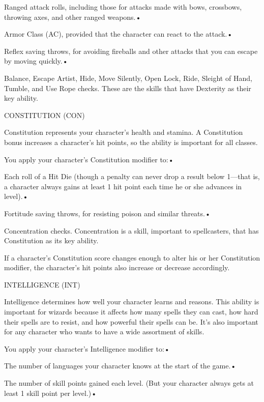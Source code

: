 \parindent=3pt
Ranged attack rolls, including those for attacks made with bows, crossbows, throwing 
axes, and other ranged weapons.• 

Armor Class (AC), provided that the character can react to the attack.• 

\parindent=7pt
Reflex saving throws, for avoiding fireballs and other attacks that you can escape 
by moving quickly.• 

\parindent=3pt
Balance, Escape Artist, Hide, Move Silently, Open Lock, Ride, Sleight of Hand, 
Tumble, and Use Rope checks. These are the skills that have Dexterity as their 
key ability.

\vspace{12pt}
\parindent=0pt
CONSTITUTION (CON)

Constitution represents your character's health and stamina. A Constitution bonus 
increases a character's hit points, so the ability is important for all classes.

You apply your character's Constitution modifier to:• 

\parindent=3pt
Each roll of a Hit Die (though a penalty can never drop a result below 1---that 
is, a character always gains at least 1 hit point each time he or she advances 
in level).• 

Fortitude saving throws, for resisting poison and similar threats.• 

\parindent=7pt
Concentration checks. Concentration is a skill, important to spellcasters, that 
has Constitution as its key ability.

\parindent=0pt
If a character's Constitution score changes enough to alter his or her Constitution 
modifier, the character's hit points also increase or decrease accordingly.

\vspace{12pt}
INTELLIGENCE (INT)

Intelligence determines how well your character learns and reasons. This ability 
is important for wizards because it affects how many spells they can cast, how 
hard their spells are to resist, and how powerful their spells can be. It's also 
important for any character who wants to have a wide assortment of skills.

You apply your character's Intelligence modifier to:• 

\parindent=3pt
The number of languages your character knows at the start of the game.• 

The number of skill points gained each level. (But your character always gets at 
least 1 skill point per level.)• 

